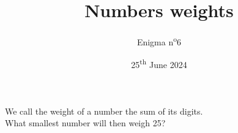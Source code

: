 \documentclass[a4paper, top=10mm]{article}
\title{\textbf{\huge{Numbers weights}}}
\author{Enigma n\textsuperscript{o}6}
\date{25\textsuperscript{th} June 2024}
\begin{document}
	\maketitle
	
	\Large
	We call the weight of a number the sum of its digits.\\
	What smallest number will then weigh 25?
	
	\vspace{1cm}
	
	\begin{center}
	\end{center}
	
	
\end{document}
